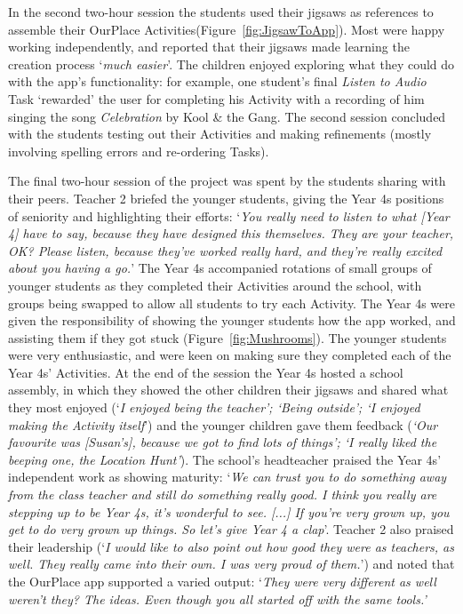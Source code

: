 \documentclass[,hyphens]{sigchi}
\begin{document}
In the second two-hour session the students used their jigsaws as references to assemble their OurPlace Activities(Figure~\ref{fig:JigsawToApp}). Most were happy working independently, and reported that their jigsaws made learning the creation process `\textit{much easier}'. The children enjoyed exploring what they could do with the app's functionality: for example, one student's final \textit{Listen to Audio} Task `rewarded' the user for completing his Activity with a recording of him singing the song \textit{Celebration} by Kool \& the Gang. The second session concluded with the students testing out their Activities and making refinements (mostly involving spelling errors and re-ordering Tasks). 

The final two-hour session of the project was spent by the students sharing with their peers. Teacher 2 briefed the younger students, giving the Year 4s positions of seniority and highlighting their efforts: `\textit{You really need to listen to what [Year 4] have to say, because they have designed this themselves. They are your teacher, OK? Please listen, because they've worked really hard, and they're really excited about you having a go.}' The Year 4s accompanied rotations of small groups of younger students as they completed their Activities around the school, with groups being swapped to allow all students to try each Activity. The Year 4s were given the responsibility of showing the younger students how the app worked, and assisting them if they got stuck (Figure~\ref{fig:Mushrooms}). The younger students were very enthusiastic, and were keen on making sure they completed each of the Year 4s' Activities. At the end of the session the Year 4s hosted a school assembly, in which they showed the other children their jigsaws and shared what they most enjoyed (`\textit{I enjoyed being the teacher'; `Being outside'; `I enjoyed making the Activity itself}') and the younger children gave them feedback (\textit{`Our favourite was [Susan's], because we got to find lots of things'; `I really liked the beeping one, the Location Hunt'}). The school's headteacher praised the Year 4s' independent work as showing maturity: `\textit{We can trust you to do something away from the class teacher and still do something really good. I think you really are stepping up to be Year 4s, it's wonderful to see. [...] If you're very grown up, you get to do very grown up things. So let's give Year 4 a clap}'. Teacher 2 also praised their leadership (`\textit{I would like to also point out how good they were as teachers, as well. They really came into their own. I was very proud of them.}') and noted that the OurPlace app supported a varied output: `\textit{They were very different as well weren't they? The ideas. Even though you all started off with the same tools.'}
\end{document}
